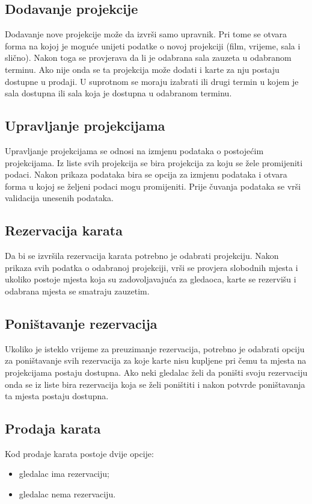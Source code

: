 \subsection{Dodavanje projekcije}
Dodavanje nove projekcije može da izvrši samo upravnik. Pri tome se otvara forma na kojoj je moguće unijeti podatke o novoj 
projekciji (film, vrijeme, sala i slično). Nakon toga se provjerava da li je odabrana 
sala zauzeta u odabranom terminu. Ako nije onda se ta projekcija može dodati i karte za nju postaju dostupne u prodaji. U suprotnom 
se moraju izabrati ili drugi termin u kojem je sala dostupna ili sala koja je dostupna u odabranom terminu.

\subsection{Upravljanje projekcijama}
Upravljanje projekcijama se odnosi na izmjenu podataka o postojećim projekcijama. Iz liste svih projekcija se bira projekcija 
za koju se žele promijeniti podaci. Nakon prikaza podataka bira se opcija za izmjenu podataka i otvara forma u kojoj se 
željeni podaci mogu promijeniti. Prije čuvanja podataka se vrši validacija unesenih podataka.

\subsection{Rezervacija karata}
Da bi se izvršila rezervacija karata potrebno je odabrati projekciju. Nakon prikaza svih podatka o odabranoj projekciji, 
vrši se provjera slobodnih mjesta i ukoliko postoje mjesta koja su zadovoljavajuća za gledaoca, karte se rezervišu 
i odabrana mjesta se smatraju zauzetim.

\subsection{Poništavanje rezervacija}
Ukoliko je isteklo vrijeme za preuzimanje rezervacija, potrebno je odabrati opciju za poništavanje svih rezervacija za 
koje karte nisu kupljene pri čemu ta mjesta na projekcijama postaju dostupna. 
Ako neki gledalac želi da poništi svoju rezervaciju onda se iz liste bira rezervacija koja se želi poništiti i nakon potvrde poništavanja
ta mjesta postaju dostupna.

\subsection{Prodaja karata}
Kod prodaje karata postoje dvije opcije:
\begin{itemize}
\item gledalac ima rezervaciju;
\item gledalac nema rezervaciju.
\end{itemize}

